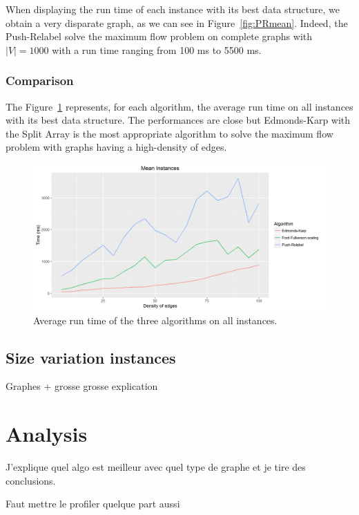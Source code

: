 When displaying the run time of each instance with its best data structure, we obtain a very disparate graph, as we can see in Figure~\ref{fig:PRmean}. Indeed, the Push-Relabel solve the maximum flow problem on complete graphs with $|V|=1000$ with a run time ranging from 100 ms to 5500 ms.

\subsubsection{Comparison}
The Figure~\ref{fig:MeanInstances} represents, for each algorithm, the average run time on all instances with its best data structure. The performances are close but Edmonds-Karp with the Split Array is the most appropriate algorithm to solve the maximum flow problem with graphs having a high-density of edges.

\begin{figure}[H]
\includegraphics[scale=0.65]{images/MeanInstances.png}
\caption{Average run time of the three algorithms on all instances.}
\label{fig:MeanInstances}
\end{figure}

\subsection{Size variation instances}
Graphes + grosse grosse explication

\section{Analysis}

J'explique quel algo est meilleur avec quel type de graphe et je tire des conclusions.

Faut mettre le profiler quelque part aussi